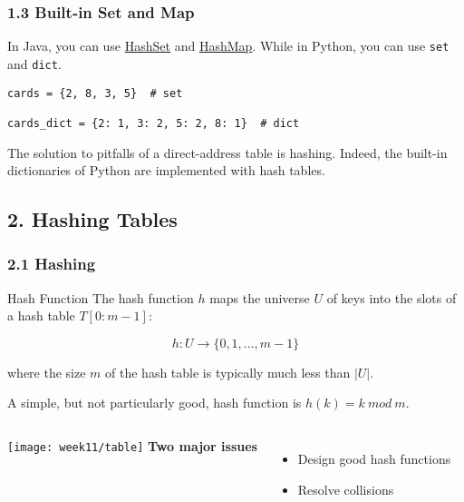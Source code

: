 \documentclass[aspectratio=169, 14pt]{beamer}
\begin{document}
\begin{frame}[fragile]
	\frametitle{1.3 Built-in Set and Map}
	 In Java, you can use \href{https://docs.oracle.com/en/java/javase/11/docs/api/java.base/java/util/HashSet.html}{HashSet} and \href{https://docs.oracle.com/en/java/javase/11/docs/api/java.base/java/util/HashMap.html}{HashMap}. While in Python, you can use \texttt{set} and \texttt{dict}.

	\begin{verbatim}
cards = {2, 8, 3, 5}  # set

cards_dict = {2: 1, 3: 2, 5: 2, 8: 1}  # dict
\end{verbatim}

	The solution to pitfalls of a direct-address table is \alert{hashing}. Indeed, the built-in dictionaries of Python are implemented with hash tables.

\end{frame}

\begin{frame}

	\section{\textcolor{darkmidnightblue}{2. Hashing Tables}}
\end{frame}

\begin{frame}
	\frametitle{2.1 Hashing}
	\begin{exampleblock}{Hash Function}
		The hash function $h$ maps the universe $U$ of keys into the slots of a \alert{hash table} $T[0:m-1]$:

		\[h: U \rightarrow \{0, 1, \dots, m - 1\}\]

		where the size $m$ of the hash table is typically much less than $|U|$.
	\end{exampleblock}

	A simple, but not particularly good, hash function is $h(k) = k \ mod \ m$.
\end{frame}

\begin{frame}
	\begin{columns}
		\texttt{[image: week11/table]}
		 \textbf{Two major issues}
		\begin{itemize}
			\item Design good hash functions
			\item Resolve collisions
		\end{itemize}
	\end{columns}


\end{frame}
\end{document}
